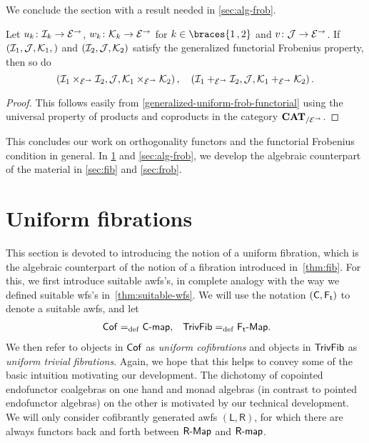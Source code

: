 \documentclass[reqno,10pt,a4paper,oneside,draft]{amsart}
\newcommand{\LL}{\mathsf{L}}
\newcommand{\RR}{\mathsf{R}}
\begin{document}
{{We conclude the section with a result needed in \cref{sec:alg-frob}.

\begin{proposition} \label{generalized-uniform-frob-product-u}
Let $u_k \co \cal{I}_k \to \cal{E}^\to$, $w_k \co \cal{K}_k \to \cal{E}^\to$ for $k \in \braces{1\,, 2}$ and $v \co \cal{J} \to \cal{E}^\to$.
If $(\cal{I}_1, \cal{J}, \cal{K}_1,)$ and $(\cal{I}_2, \cal{J}, \cal{K}_2)$ satisfy the generalized functorial Frobenius property, then so do
\[
(\cal{I}_1 \times_{\cal{E}^\to} \cal{I}_2, \cal{J}, \cal{K}_1 \times_{\cal{E}^\to} \cal{K}_2)
\, , \quad
(\cal{I}_1 +_{\cal{E}^\to} \cal{I}_2, \cal{J}, \cal{K}_1 +_{\cal{E}^\to} \cal{K}_2)
\, .\]
\end{proposition}

\begin{proof}
This follows easily from \cref{generalized-uniform-frob-functorial} using the universal property of products and coproducts in the category $\CAT_{/\cal{E}^\to}$.
\end{proof}

This concludes our work on orthogonality functors and the functorial Frobenius condition in general.
In \cref{sec:alg-fib} and \cref{sec:alg-frob}, we develop the algebraic counterpart of the material in \cref{sec:fib} and \cref{sec:frob}.

\section{Uniform fibrations}
\label{sec:alg-fib}

This section is devoted to introducing the notion of a uniform fibration, which is the algebraic counterpart of the notion of a fibration introduced in~\cref{thm:fib}.
For this, we first introduce suitable awfs's, in complete analogy with the way we defined suitable wfs's in~\cref{thm:suitable-wfs}.
We will use the notation $(\CC, \TF)$ to denote a suitable awfs, and let
\[
\begin{aligned}
\Cof \defeq \pcoalg{\CC}
,&&
\TrivFib \defeq \pAlg{\TF} \rlap{.} 
\end{aligned}
\]
We then refer to objects in $\Cof$ as \emph{uniform cofibrations} and objects in $\TrivFib$ as \emph{uniform trivial fibrations}.
Again, we hope that this helps to convey some of the basic intuition motivating our development.
The dichotomy of copointed endofunctor coalgebras on one hand and monad algebras (in contrast to pointed endofunctor algebras) on the other is motivated by our technical development.
We will only consider cofibrantly generated awfs $(\LL, \RR)$, for which there are always functors back and forth between $\pAlg{\RR}$ and $\palg{\RR}$.

}}
\end{document}
